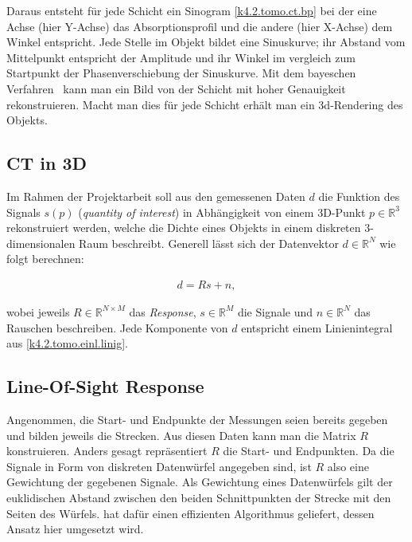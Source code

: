 \documentclass[]{dsadokumentation}
\begin{document}
Daraus entsteht für jede Schicht ein Sinogram \cref{k4.2.tomo.ct.bp} bei der eine Achse (hier Y-Achse) das Absorptionsprofil und die andere (hier X-Achse) dem Winkel entspricht. Jede Stelle im Objekt bildet eine Sinuskurve; ihr Abstand vom Mittelpunkt entspricht der Amplitude und ihr Winkel im vergleich zum Startpunkt der Phasenverschiebung der Sinuskurve. Mit dem bayeschen Verfahren  kann man ein Bild von der Schicht mit hoher Genauigkeit rekonstruieren. Macht man dies für jede Schicht erhält man ein 3d-Rendering des Objekts.


\subsection{CT in 3D}

Im Rahmen der Projektarbeit soll aus den gemessenen Daten $d$ die Funktion des Signals $s(p)$ (\emph{quantity of interest}) in Abhängigkeit von einem 3D-Punkt $p \in \mathbb{R}^3$ rekonstruiert werden, welche die Dichte eines Objekts in einem diskreten 3-dimensionalen Raum beschreibt. Generell lässt sich der Datenvektor $d \in \mathbb{R}^N$ wie folgt berechnen:

\begin{equation}
  \begin{aligned}
    d = Rs + n,
  \end{aligned}
\end{equation}

wobei jeweils $R \in \mathbb{R}^{N \times M}$ das \emph{Response}, $s \in \mathbb{R}^M$ die Signale und $n \in \mathbb{R}^N$ das Rauschen beschreiben. Jede Komponente von $d$ entspricht einem Linienintegral aus \cref{k4.2.tomo.einl.linig}.

\subsection{Line-Of-Sight Response}

Angenommen, die Start- und Endpunkte der Messungen seien bereits gegeben und bilden jeweils die Strecken. Aus diesen Daten kann man die Matrix $R$ konstruieren. Anders gesagt repräsentiert $R$ die Start- und Endpunkten. Da die Signale in Form von diskreten Datenwürfel angegeben sind, ist $R$ also eine Gewichtung der gegebenen Signale. Als Gewichtung eines Datenwürfels gilt der euklidischen Abstand zwischen den beiden Schnittpunkten der Strecke mit den Seiten des Würfels. \textcite{k4.2.siddon} hat dafür einen effizienten Algorithmus geliefert, dessen Ansatz hier umgesetzt wird.
\end{document}
